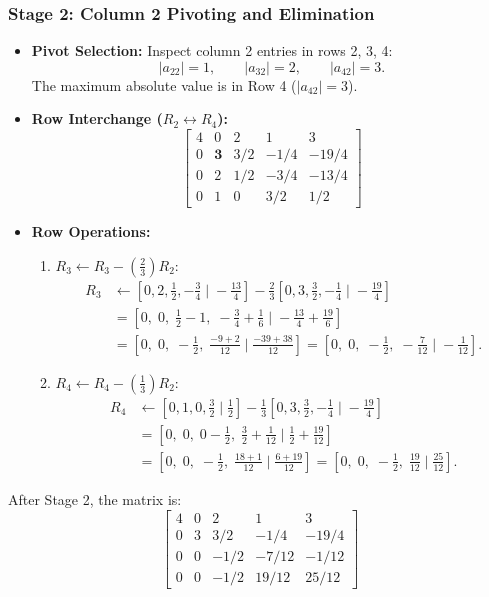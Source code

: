 \documentclass[11pt,a4paper]{article}
\begin{document}
\subsubsection*{Stage 2: Column 2 Pivoting and Elimination}
\begin{itemize}
    \item \textbf{Pivot Selection:} Inspect column 2 entries in rows 2, 3, 4:
    \[
    |a_{22}| = 1, \qquad |a_{32}| = 2, \qquad |a_{42}| = 3.
    \]
    The maximum absolute value is in Row 4 ($|a_{42}| = 3$).
    \item \textbf{Row Interchange ($R_2 \longleftrightarrow R_4$):}
    \[
    \left[\begin{array}{cccc|c}
    4 & 0 & 2 & 1 & 3 \\
    0 & \mathbf{3} & 3/2 & -1/4 & -19/4 \\
    0 & 2 & 1/2 & -3/4 & -13/4 \\
    0 & 1 & 0 & 3/2 & 1/2
    \end{array}\right]
    \]
    \item \textbf{Row Operations:}
    \begin{enumerate}[label=(\roman*)]
        \item $R_3 \leftarrow R_3 - \left(\frac{2}{3}\right)R_2$:
        \begin{align*}
        R_3 &\leftarrow \left[0, 2, \frac{1}{2}, -\frac{3}{4} \;\Big|\; -\frac{13}{4}\right] - \frac{2}{3}\left[0, 3, \frac{3}{2}, -\frac{1}{4} \;\Big|\; -\frac{19}{4}\right] \\
            &= \left[0, \; 0, \; \frac{1}{2} - 1, \; -\frac{3}{4} + \frac{1}{6} \;\Big|\; -\frac{13}{4} + \frac{19}{6}\right] \\
            &= \left[0, \; 0, \; -\frac{1}{2}, \; \frac{-9 + 2}{12} \;\Big|\; \frac{-39 + 38}{12}\right] = \left[0, \; 0, \; -\frac{1}{2}, \; -\frac{7}{12} \;\Big|\; -\frac{1}{12}\right].
        \end{align*}
        \item $R_4 \leftarrow R_4 - \left(\frac{1}{3}\right)R_2$:
        \begin{align*}
        R_4 &\leftarrow \left[0, 1, 0, \frac{3}{2} \;\Big|\; \frac{1}{2}\right] - \frac{1}{3}\left[0, 3, \frac{3}{2}, -\frac{1}{4} \;\Big|\; -\frac{19}{4}\right] \\
            &= \left[0, \; 0, \; 0 - \frac{1}{2}, \; \frac{3}{2} + \frac{1}{12} \;\Big|\; \frac{1}{2} + \frac{19}{12}\right] \\
            &= \left[0, \; 0, \; -\frac{1}{2}, \; \frac{18 + 1}{12} \;\Big|\; \frac{6 + 19}{12}\right] = \left[0, \; 0, \; -\frac{1}{2}, \; \frac{19}{12} \;\Big|\; \frac{25}{12}\right].
        \end{align*}
    \end{enumerate}
\end{itemize}
After Stage 2, the matrix is:
\[
\left[\begin{array}{cccc|c}
4 & 0 & 2 & 1 & 3 \\
0 & 3 & 3/2 & -1/4 & -19/4 \\
0 & 0 & -1/2 & -7/12 & -1/12 \\
0 & 0 & -1/2 & 19/12 & 25/12
\end{array}\right]
\]
\end{document}
